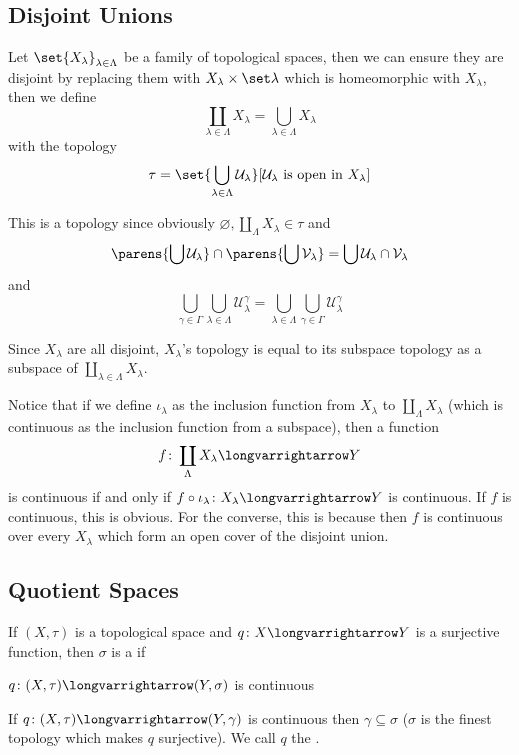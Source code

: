 \documentclass[10pt]{article}
\def\mU{\mathcal{U}}
\def\mV{\mathcal{V}}
\def\longto{\longvarrightarrow}
\begin{document}
\newpage
\subsection{Disjoint Unions}

\begin{defn*}

    Let $\set{X_\lambda}_{\lambda\in\Lambda}$ be a family of topological spaces, then we can ensure they are disjoint by replacing them with $X_\lambda\times\set\lambda$ which is homeomorphic with
    $X_\lambda$, then we define
    \[ \coprod_{\lambda\in\Lambda}X_\lambda = \bigcup_{\lambda\in\Lambda}X_\lambda \]
    with the topology
    \[ \tau = \set{\bigcup_{\lambda\in\Lambda}\mU_\lambda}[\mU_\lambda\text{ is open in }X_\lambda] \]

\end{defn*}

This is a topology since obviously $\varnothing,\coprod_\Lambda X_\lambda\in\tau$ and
\[ \parens{\bigcup \mU_\lambda}\cap\parens{\bigcup \mV_\lambda} = \bigcup \mU_\lambda\cap\mV_\lambda \]
and
\[ \bigcup_{\gamma\in\Gamma}\bigcup_{\lambda\in\Lambda}\mU_\lambda^\gamma = \bigcup_{\lambda\in\Lambda}\bigcup_{\gamma\in\Gamma}\mU_\lambda^\gamma \]

Since $X_\lambda$ are all disjoint, $X_\lambda$'s topology is equal to its subspace topology as a subspace of $\coprod_{\lambda\in\Lambda}X_\lambda$.

Notice that if we define $\iota_\lambda$ as the inclusion function from $X_\lambda$ to $\coprod_\Lambda X_\lambda$ (which is continuous as the inclusion function from a subspace), then a function
\[ f\colon\coprod_\Lambda X_\lambda\longto Y \]
is continuous if and only if $f\circ\iota_\lambda\colon X_\lambda\longto Y$ is continuous.
If $f$ is continuous, this is obvious.
For the converse, this is because then $f$ is continuous over every $X_\lambda$ which form an open cover of the disjoint union.

\subsection{Quotient Spaces}

\begin{defn*}

    If $(X,\tau)$ is a topological space and $q\colon X\longto Y$ is a surjective function, then $\sigma$ is a  if
    \benum
        \item $q\colon(X,\tau)\longto(Y,\sigma)$ is continuous
        \item If $q\colon(X,\tau)\longto(Y,\gamma)$ is continuous then $\gamma\subseteq\sigma$ ($\sigma$ is the finest topology which makes $q$ surjective).
    \eenum
    We call $q$ the .

\end{defn*}
\end{document}
